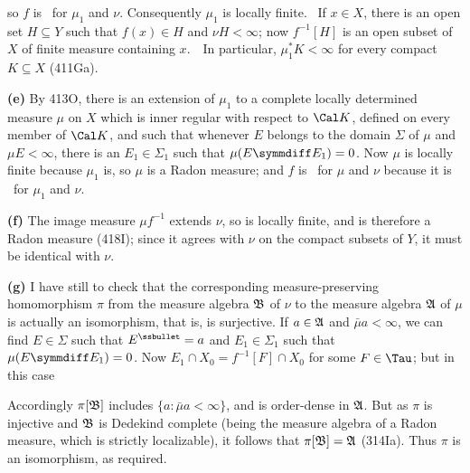 {

\noindent so $f$ is \imp\ for $\mu_1$ and $\nu$.   Consequently $\mu_1$
is locally finite.   \Prf\ If $x\in X$, there is an open set $H\subseteq
Y$ such that $f(x)\in H$ and $\nu H<\infty$;  now $f^{-1}[H]$ is an open
subset of $X$ of finite measure containing $x$.\ \QeD\  In particular,
$\mu_1^*K<\infty$ for every compact $K\subseteq X$ (411Ga).

\medskip

{\bf (e)} By 413O, there is an extension of $\mu_1$ to a complete
locally determined measure $\mu$ on $X$ which is inner regular with
respect to $\Cal K$, defined on every member of $\Cal K$, and such that
whenever $E$
belongs to the domain $\Sigma$ of $\mu$ and $\mu E<\infty$, there is an
$E_1\in\Sigma_1$ such that $\mu(E\symmdiff E_1)=0$.   Now $\mu$ is
locally finite because $\mu_1$ is, so $\mu$ is a Radon measure;  and $f$
is \imp\ for $\mu$ and $\nu$ because it is \imp\ for $\mu_1$ and $\nu$.

\medskip

{\bf (f)} The image measure $\mu f^{-1}$ extends $\nu$, so is locally
finite, and is therefore a Radon measure (418I);  since it agrees with
$\nu$ on the compact subsets of $Y$, it must be identical with $\nu$.

\medskip

{\bf (g)} I have still to check that the corresponding
measure-preserving
homomorphism $\pi$ from the measure algebra $\frak B$ of $\nu$ to the
measure algebra $\frak A$ of $\mu$ is actually an isomorphism, that is,
is surjective.   If $a\in\frak A$ and $\bar\mu a<\infty$, we can find
$E\in\Sigma$ such that $E^{\ssbullet}=a$ and $E_1\in\Sigma_1$ such that
$\mu(E\symmdiff E_1)=0$.   Now $E_1\cap X_0=f^{-1}[F]\cap X_0$ for some
$F\in\Tau$;  but in this case


Accordingly $\pi[\frak B]$ includes $\{a:\bar\mu a<\infty\}$, and is
order-dense in $\frak A$.   But as $\pi$ is injective and $\frak B$ is
Dedekind complete (being the measure algebra of a Radon measure, which
is strictly localizable), it follows that $\pi[\frak B]=\frak A$
(314Ia).   Thus $\pi$ is an isomorphism, as required.
}%


